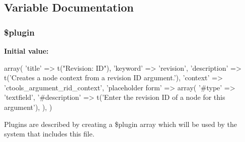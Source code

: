 \subsection{Variable Documentation}
\hypertarget{rid_8inc_ada8a7130088351710bb02ed622d6bf65}{
\subsubsection[{\$plugin}]{\setlength{\rightskip}{0pt plus 5cm}\$plugin}}
\label{rid_8inc_ada8a7130088351710bb02ed622d6bf65}
{\bfseries Initial value:}
\begin{DoxyCode}
 array(
  'title' => t("Revision: ID"),
  'keyword' => 'revision',
  'description' => t('Creates a node context from a revision ID argument.'),
  'context' => 'ctools_argument_rid_context',
  'placeholder form' => array(
    '#type' => 'textfield',
    '#description' => t('Enter the revision ID of a node for this argument'),
  ),
)
\end{DoxyCode}
Plugins are described by creating a \$plugin array which will be used by the system that includes this file. 